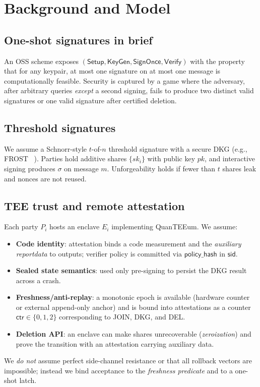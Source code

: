 \documentclass[runningheads,orivec]{llncs}
\newcommand{\prot}{\textsf{QuanTEEum}}
\newcommand{\oss}{\textsf{OSS}}
\begin{document}
\section{Background and Model}
\subsection{One-shot signatures in brief}
An \oss{} scheme exposes $(\mathsf{Setup},\mathsf{KeyGen},\mathsf{SignOnce},\mathsf{Verify})$ with the property that for any keypair, at most one signature on at most one message is computationally feasible. Security is captured by a game where the adversary, after arbitrary queries \emph{except} a second signing, fails to produce two distinct valid signatures or one valid signature after certified deletion.

\subsection{Threshold signatures}
We assume a Schnorr-style $t$-of-$n$ threshold signature with a secure DKG (e.g., FROST ~\cite{komlo2020frost}). Parties hold additive shares $\{sk_i\}$ with public key $pk$, and interactive signing produces $\sigma$ on message $m$. Unforgeability holds if fewer than $t$ shares leak and nonces are not reused.

\subsection{TEE trust and remote attestation}
Each party $P_i$ hosts an enclave $E_i$ implementing \prot{}. We assume:
\begin{itemize}[leftmargin=*,itemsep=0.25em]
  \item \textbf{Code identity}: attestation binds a code measurement and the \emph{auxiliary reportdata} to outputs; verifier policy is committed via $\mathsf{policy\_hash}$ in $\mathsf{sid}$.
  \item \textbf{Sealed state semantics}: used only pre-signing to persist the DKG result across a crash.
  \item \textbf{Freshness/anti-replay}: a monotonic epoch is available (hardware counter or external append-only anchor) and is bound into attestations as a counter $\mathsf{ctr}\in\{0,1,2\}$ corresponding to JOIN, DKG, and DEL.
  \item \textbf{Deletion API}: an enclave can make shares unrecoverable (\emph{zeroization}) and prove the transition with an attestation carrying auxiliary data.
\end{itemize}
We \emph{do not} assume perfect side-channel resistance or that all rollback vectors are impossible; instead we bind acceptance to the \emph{freshness predicate} and to a one-shot latch.
\end{document}

